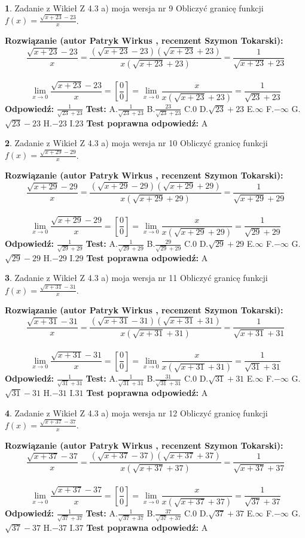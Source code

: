 \documentclass[12pt, a4paper]{article}
\theoremstyle{definition} %
\newtheorem{zad}{}
\newcommand{\zadStart}[1]{\begin{zad}#1\newline}
\newcommand{\zadStop}{\end{zad}}
\newcommand{\rozwStart}[2]{\noindent \textbf{Rozwiązanie (autor #1 , recenzent #2): }\newline}
\newcommand{\rozwStop}{\newline}
\newcommand{\odpStart}{\noindent \textbf{Odpowiedź:}\newline}
\newcommand{\odpStop}{\newline}
\newcommand{\testStart}{\noindent \textbf{Test:}\newline}
\newcommand{\testStop}{\newline}
\newcommand{\kluczStart}{\noindent \textbf{Test poprawna odpowiedź:}\newline}
\newcommand{\kluczStop}{\newline}
\begin{document}
\zadStart{Zadanie z Wikieł Z 4.3 a) moja wersja nr 9}
Obliczyć granicę funkcji $f(x)=\frac{\sqrt{x+23}-23}{x}$.
\zadStop
\rozwStart{Patryk Wirkus}{Szymon Tokarski}
$$\frac{\sqrt{x+23}-23}{x}=\frac{(\sqrt{x+23}-23)(\sqrt{x+23}+23)}{x(\sqrt{x+23}+23)}=\frac{1}{\sqrt{x+23}+23}$$
\\
$$\lim\limits_{x\to0}\frac{\sqrt{x+23}-23}{x}=[\frac{0}{0}]=
\lim\limits_{x\to0}\frac{x}{x(\sqrt{x+23}+23)} = \frac{1}{\sqrt{23}+23}$$
\rozwStop
\odpStart
$\frac{1}{\sqrt{23}+23}$
\odpStop
\testStart
A.$\frac{1}{\sqrt{23}+23}$
B.$\frac{23}{\sqrt{23}+23}$
C.$0$
D.$\sqrt{23}+23$
E.$\infty$
F.$-\infty$
G.$\sqrt{23}-23$
H.$-23$
I.$23$
\testStop
\kluczStart
A
\kluczStop



\zadStart{Zadanie z Wikieł Z 4.3 a) moja wersja nr 10}
Obliczyć granicę funkcji $f(x)=\frac{\sqrt{x+29}-29}{x}$.
\zadStop
\rozwStart{Patryk Wirkus}{Szymon Tokarski}
$$\frac{\sqrt{x+29}-29}{x}=\frac{(\sqrt{x+29}-29)(\sqrt{x+29}+29)}{x(\sqrt{x+29}+29)}=\frac{1}{\sqrt{x+29}+29}$$
\\
$$\lim\limits_{x\to0}\frac{\sqrt{x+29}-29}{x}=[\frac{0}{0}]=
\lim\limits_{x\to0}\frac{x}{x(\sqrt{x+29}+29)} = \frac{1}{\sqrt{29}+29}$$
\rozwStop
\odpStart
$\frac{1}{\sqrt{29}+29}$
\odpStop
\testStart
A.$\frac{1}{\sqrt{29}+29}$
B.$\frac{29}{\sqrt{29}+29}$
C.$0$
D.$\sqrt{29}+29$
E.$\infty$
F.$-\infty$
G.$\sqrt{29}-29$
H.$-29$
I.$29$
\testStop
\kluczStart
A
\kluczStop



\zadStart{Zadanie z Wikieł Z 4.3 a) moja wersja nr 11}
Obliczyć granicę funkcji $f(x)=\frac{\sqrt{x+31}-31}{x}$.
\zadStop
\rozwStart{Patryk Wirkus}{Szymon Tokarski}
$$\frac{\sqrt{x+31}-31}{x}=\frac{(\sqrt{x+31}-31)(\sqrt{x+31}+31)}{x(\sqrt{x+31}+31)}=\frac{1}{\sqrt{x+31}+31}$$
\\
$$\lim\limits_{x\to0}\frac{\sqrt{x+31}-31}{x}=[\frac{0}{0}]=
\lim\limits_{x\to0}\frac{x}{x(\sqrt{x+31}+31)} = \frac{1}{\sqrt{31}+31}$$
\rozwStop
\odpStart
$\frac{1}{\sqrt{31}+31}$
\odpStop
\testStart
A.$\frac{1}{\sqrt{31}+31}$
B.$\frac{31}{\sqrt{31}+31}$
C.$0$
D.$\sqrt{31}+31$
E.$\infty$
F.$-\infty$
G.$\sqrt{31}-31$
H.$-31$
I.$31$
\testStop
\kluczStart
A
\kluczStop



\zadStart{Zadanie z Wikieł Z 4.3 a) moja wersja nr 12}
Obliczyć granicę funkcji $f(x)=\frac{\sqrt{x+37}-37}{x}$.
\zadStop
\rozwStart{Patryk Wirkus}{Szymon Tokarski}
$$\frac{\sqrt{x+37}-37}{x}=\frac{(\sqrt{x+37}-37)(\sqrt{x+37}+37)}{x(\sqrt{x+37}+37)}=\frac{1}{\sqrt{x+37}+37}$$
\\
$$\lim\limits_{x\to0}\frac{\sqrt{x+37}-37}{x}=[\frac{0}{0}]=
\lim\limits_{x\to0}\frac{x}{x(\sqrt{x+37}+37)} = \frac{1}{\sqrt{37}+37}$$
\rozwStop
\odpStart
$\frac{1}{\sqrt{37}+37}$
\odpStop
\testStart
A.$\frac{1}{\sqrt{37}+37}$
B.$\frac{37}{\sqrt{37}+37}$
C.$0$
D.$\sqrt{37}+37$
E.$\infty$
F.$-\infty$
G.$\sqrt{37}-37$
H.$-37$
I.$37$
\testStop
\kluczStart
A
\kluczStop
\end{document}
